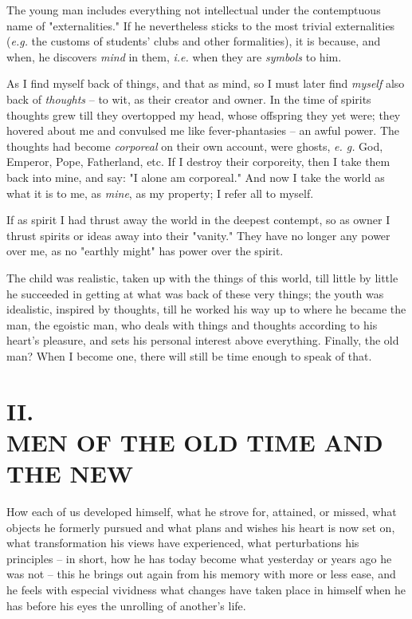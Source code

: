 \documentclass[a4paper]{book}
\begin{document}
The young man includes everything not intellectual under the contemptuous name 
of "{}externalities."{} If he nevertheless sticks to the most trivial 
externalities (\textit{e.g.} the customs of students' clubs and other 
formalities), it is because, and when, he discovers \textit{mind} in them, 
\textit{i.e.} when they are \textit{symbols} to him.

As I find myself back of things, and that as mind, so I must later find 
\textit{myself} also back of \textit{thoughts} -- to wit, as their creator and 
owner. In the time of spirits thoughts grew till they overtopped my head, 
whose offspring they yet were; they hovered about me and convulsed me like 
fever-phantasies -- an awful power. The thoughts had become \textit{corporeal} 
on their own account, were ghosts, \textit{e. g.} God, Emperor, Pope, 
Fatherland, etc. If I destroy their corporeity, then I take them back into 
mine, and say: "{}I alone am corporeal."{} And now I take the world as what it 
is to me, as \textit{mine}, as my property; I refer all to myself.

If as spirit I had thrust away the world in the deepest contempt, so as owner 
I thrust spirits or ideas away into their "{}vanity."{} They have no longer 
any power over me, as no "{}earthly might"{} has power over the spirit.

The child was realistic, taken up with the things of this world, till little 
by little he succeeded in getting at what was back of these very things; the 
youth was idealistic, inspired by thoughts, till he worked his way up to where 
he became the man, the egoistic man, who deals with things and thoughts 
according to his heart's pleasure, and sets his personal interest above 
everything. Finally, the old man? When I become one, there will still be time 
enough to speak of that.

\chapter[II. Men Of The Old And The New]{\centering II.\\
MEN OF THE OLD TIME AND THE NEW}

\medskip{}

\noindent{}How each of us developed himself, what he strove for, attained, or 
missed, what objects he formerly pursued and what plans and wishes his heart 
is now set on, what transformation his views have experienced, what 
perturbations his principles -- in short, how he has today become what 
yesterday or years ago he was not -- this he brings out again from his memory 
with more or less ease, and he feels with especial vividness what changes have 
taken place in himself when he has before his eyes the unrolling of another's 
life.
\end{document}
